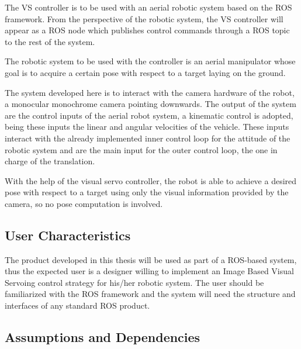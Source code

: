 The VS controller is to be used with an aerial robotic system based on the ROS framework. From the perspective of the robotic system, the VS controller will appear as a ROS node which publishes control commands through a ROS topic to the rest of the system.

The robotic system to be used with the controller is an aerial manipulator whose goal is to acquire a certain pose with respect to a target laying on the ground. 

The system developed here is to interact with the camera hardware of the robot, a monocular monochrome camera pointing downwards. The output of the system are the control inputs of the aerial robot system, a kinematic control is adopted, being these inputs the linear and angular velocities of the vehicle. These inputs interact with the already implemented inner control loop for the attitude of the robotic system and are the main input for the outer control loop, the one in charge of the translation.




With the help of the visual servo controller, the robot is able to achieve a desired pose with respect to a target using only the visual information provided by the camera, so no pose computation is involved.

\subsection{User Characteristics}
\label{sec:user-characteristics}

The product developed in this thesis will be used as part of a ROS-based system, thus the expected user is a designer willing to implement an Image Based Visual Servoing control strategy for his/her robotic system. The user should be familiarized with the ROS framework and the system will need the structure and interfaces of any standard ROS product.

\subsection{Assumptions and Dependencies}
\label{sec:assumptions-dependencies}

